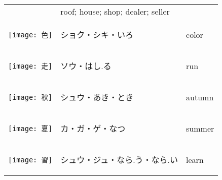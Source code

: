 \documentclass[a4paper,12pt]{extarticle}
\begin{document}
\begin{longtable}{|lp{6cm}p{4cm}|}
&
roof; house; shop; dealer; seller
\\ 
\begin{minipage}{0.3\textwidth}
\centerline{
	\texttt{[image: 色]}
}
\end{minipage}
&
\begin{CJK}{UTF8}{min}ショク・シキ・いろ\end{CJK}
&
color
\\ 
\begin{minipage}{0.3\textwidth}
\centerline{
	\texttt{[image: 走]}
}
\end{minipage}
&
\begin{CJK}{UTF8}{min}ソウ・はし.る\end{CJK}
&
run
\\ 
\begin{minipage}{0.3\textwidth}
\centerline{
	\texttt{[image: 秋]}
}
\end{minipage}
&
\begin{CJK}{UTF8}{min}シュウ・あき・とき\end{CJK}
&
autumn
\\ 
\begin{minipage}{0.3\textwidth}
\centerline{
	\texttt{[image: 夏]}
}
\end{minipage}
&
\begin{CJK}{UTF8}{min}カ・ガ・ゲ・なつ\end{CJK}
&
summer
\\ 
\begin{minipage}{0.3\textwidth}
\centerline{
	\texttt{[image: 習]}
}
\end{minipage}
&
\begin{CJK}{UTF8}{min}シュウ・ジュ・なら.う・なら.い\end{CJK}
&
learn

\end{longtable}
\end{document}
